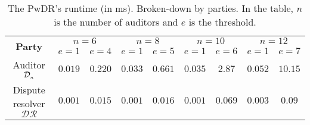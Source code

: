 

 \begin{table*}[!htb]
\caption{ \small The PwDR's runtime (in ms). Broken-down by parties. In the table, $n$ is the number of auditors and $e$ is the threshold.} \label{table::PwDR-runtime} 
\begin{center}
\renewcommand{\arraystretch}{1.6}
\begin{tabular}{|c|c|c|c|c|c|c|c|c|} 

   \hline
   

\multirow{2}{*}{\scriptsize \textbf{Party}}& \multicolumn{2}{c|}{\scriptsize $n=6$}& \multicolumn{2}{c|}{\scriptsize $n=8$}&\multicolumn{2}{c|}{\scriptsize $n=10$}&\multicolumn{2}{c|}{\scriptsize $n=12$}\\
 \cline{2-9} 
&\scriptsize$e=1$&\scriptsize$e=4$&\scriptsize$e=1$ &\scriptsize$e=5$&\scriptsize$e=1$&\scriptsize$e=6$&\scriptsize$e=1$&\scriptsize$e=7$\\

\hline

         
            \cline{1-5} 


   \scriptsize   {Auditor $\mathcal{D}_{\scriptscriptstyle n}$ }&\cellcolor{gray!20}\scriptsize$0.019$&\cellcolor{gray!20}\scriptsize$0.220$&\cellcolor{gray!20} \cellcolor{gray!20}\scriptsize$0.033$& \cellcolor{gray!20}\scriptsize$0.661$&\cellcolor{gray!20}\scriptsize$0.035$&\cellcolor{gray!20}\scriptsize$2.87$&\cellcolor{gray!20}\scriptsize$0.052$&\cellcolor{gray!20}\scriptsize$10.15$\\      
           
            \cline{1-5} 

 \scriptsize Dispute resolver $\mathcal{DR}$&\cellcolor{gray!20}\scriptsize$0.001$&\cellcolor{gray!20}\scriptsize$0.015$& \cellcolor{gray!20}\scriptsize $0.001$& \cellcolor{gray!20}\scriptsize$0.016$&\cellcolor{gray!20}\scriptsize$0.001$&\cellcolor{gray!20}\scriptsize$0.069$&\cellcolor{gray!20}\scriptsize$0.003$&\cellcolor{gray!20}\scriptsize$0.09$\\
 
 \hline
 
\end{tabular}  %
\end{center}

\end{table*}




